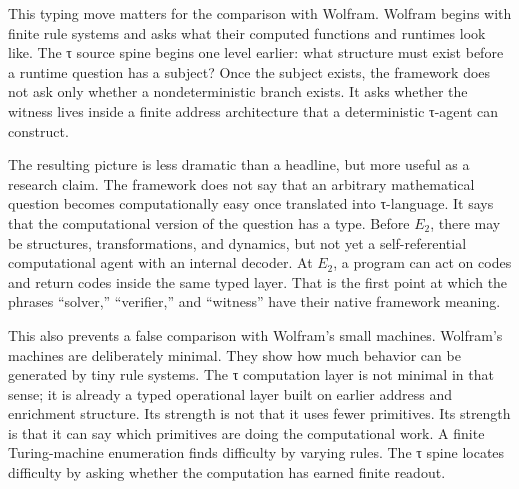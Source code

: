 \documentclass{pantarhei-researchnote}
\newcommand{\Etwo}{\ensuremath{E_2}}
\begin{document}
This typing move matters for the comparison with Wolfram. Wolfram begins
with finite rule systems and asks what their computed functions and
runtimes look like. The τ source spine begins one level earlier: what
structure must exist before a runtime question has a subject? Once the
subject exists, the framework does not ask only whether a nondeterministic
branch exists. It asks whether the witness lives inside a finite address
architecture that a deterministic τ-agent can construct.

The resulting picture is less dramatic than a headline, but more useful
as a research claim. The framework does not say that an arbitrary
mathematical question becomes computationally easy once translated into
τ-language. It says that the computational version of the question has a
type. Before \Etwo, there may be structures, transformations, and
dynamics, but not yet a self-referential computational agent with an
internal decoder. At \Etwo, a program can act on codes and return codes
inside the same typed layer. That is the first point at which the
phrases ``solver,'' ``verifier,'' and ``witness'' have their native
framework meaning.

This also prevents a false comparison with Wolfram's small machines.
Wolfram's machines are deliberately minimal. They show how much behavior
can be generated by tiny rule systems. The τ computation layer is not
minimal in that sense; it is already a typed operational layer built on
earlier address and enrichment structure. Its strength is not that it
uses fewer primitives. Its strength is that it can say which primitives
are doing the computational work. A finite Turing-machine enumeration
finds difficulty by varying rules. The τ spine locates difficulty by
asking whether the computation has earned finite readout.
\end{document}
